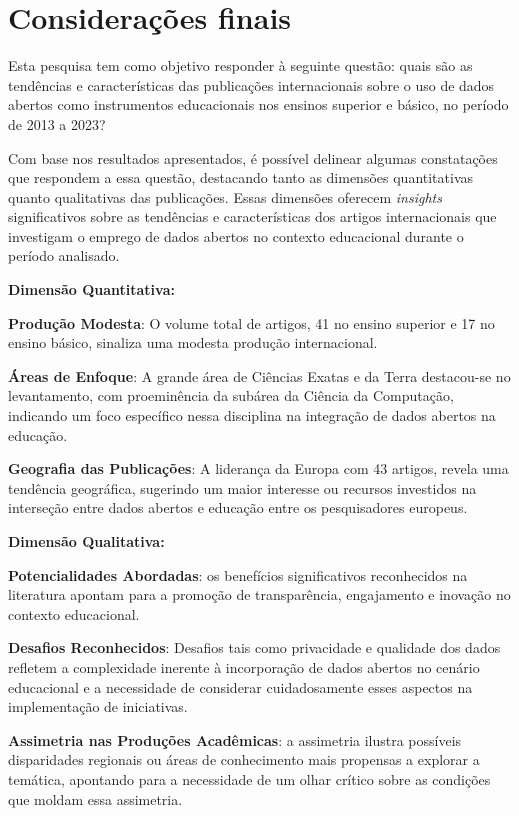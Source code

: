 \documentclass[portuguese]{textolivre}
\begin{document}
\section{Considerações finais}\label{sec-autores}
Esta pesquisa tem como objetivo responder à seguinte questão: quais são as tendências e características das publicações internacionais sobre o uso de dados abertos como instrumentos educacionais nos ensinos superior e básico, no período de 2013 a 2023?

Com base nos resultados apresentados, é possível delinear algumas constatações que respondem a essa questão, destacando tanto as dimensões quantitativas quanto qualitativas das publicações. Essas dimensões oferecem \textit{insights} significativos sobre as tendências e características dos artigos internacionais que investigam o emprego de dados abertos no contexto educacional durante o período analisado.

\textbf{Dimensão Quantitativa:}

\textbf{Produção Modesta}: O volume total de artigos, 41 no ensino superior e 17 no ensino básico, sinaliza uma modesta produção internacional.

\textbf{Áreas de Enfoque}: A grande área de Ciências Exatas e da Terra destacou-se no levantamento, com proeminência da subárea da Ciência da Computação, indicando um foco específico nessa disciplina na integração de dados abertos na educação.

\textbf{Geografia das Publicações}: A liderança da Europa com 43 artigos, revela uma tendência geográfica, sugerindo um maior interesse ou recursos investidos na interseção entre dados abertos e educação entre os pesquisadores europeus.

\textbf{Dimensão Qualitativa:}

\textbf{Potencialidades Abordadas}: os benefícios significativos reconhecidos na literatura apontam para a promoção de transparência, engajamento e inovação no contexto educacional. 

\textbf{Desafios Reconhecidos}: Desafios tais como privacidade e qualidade dos dados refletem a complexidade inerente à incorporação de dados abertos no cenário educacional e a necessidade de considerar cuidadosamente esses aspectos na implementação de iniciativas.

\textbf{Assimetria nas Produções Acadêmicas}: a assimetria ilustra possíveis disparidades regionais ou áreas de conhecimento mais propensas a explorar a temática, apontando para a necessidade de um olhar crítico sobre as condições que moldam essa assimetria.
\end{document}
